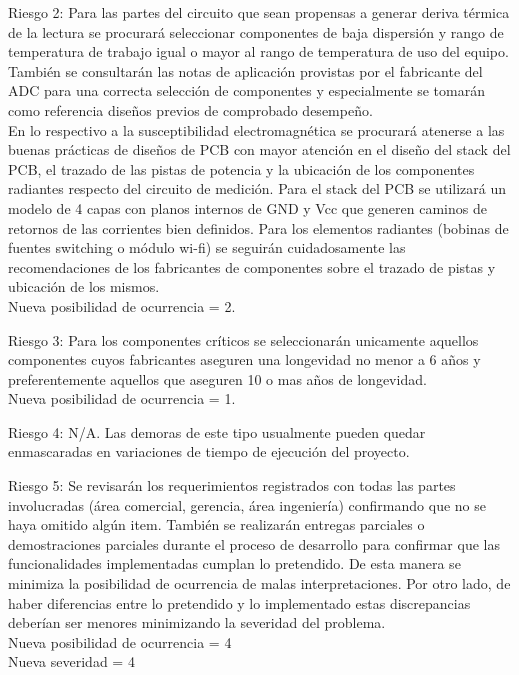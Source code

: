 \documentclass[11pt]{charter}
\begin{document}
Riesgo 2: Para las partes del circuito que sean propensas a generar deriva térmica de la lectura se procurará seleccionar componentes de baja dispersión y rango de temperatura de trabajo igual o mayor al rango de temperatura de uso del equipo. También se consultarán las notas de aplicación provistas por el fabricante del ADC para una correcta selección de componentes y especialmente se tomarán como referencia diseños previos de comprobado desempeño.\\ 
En lo respectivo a la susceptibilidad electromagnética se procurará atenerse a las buenas prácticas de diseños de PCB con mayor atención en el diseño del stack del PCB, el trazado de las pistas de potencia y la ubicación de los componentes radiantes respecto del circuito de medición. Para el stack del PCB se utilizará un modelo de 4 capas con planos internos de GND y Vcc que generen caminos de retornos de las corrientes bien definidos. Para los elementos radiantes (bobinas de fuentes switching o módulo wi-fi) se seguirán cuidadosamente las recomendaciones de los fabricantes de componentes sobre el trazado de pistas y ubicación de los mismos.\\
Nueva posibilidad de ocurrencia = 2. 
 
Riesgo 3: Para los componentes críticos se seleccionarán unicamente aquellos componentes cuyos fabricantes aseguren una longevidad no menor a 6 años y preferentemente aquellos que aseguren 10 o mas años de longevidad.\\
Nueva posibilidad de ocurrencia = 1. 

Riesgo 4: N/A. Las demoras de este tipo usualmente pueden quedar enmascaradas en variaciones de tiempo de ejecución del proyecto.

Riesgo 5: Se revisarán los requerimientos registrados con todas las partes involucradas (área comercial, gerencia, área ingeniería) confirmando que no se haya omitido algún item. También se realizarán entregas parciales o demostraciones parciales durante el proceso de desarrollo para confirmar que las funcionalidades implementadas cumplan lo pretendido. De esta manera se minimiza la posibilidad de ocurrencia de malas interpretaciones. Por otro lado, de haber diferencias entre lo pretendido y lo implementado estas discrepancias deberían ser menores minimizando la severidad del problema.\\
Nueva posibilidad de ocurrencia = 4\\
Nueva severidad = 4
\end{document}
